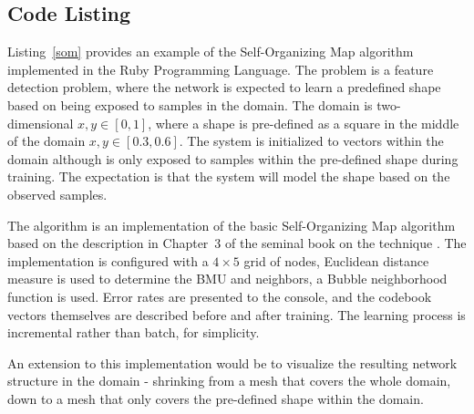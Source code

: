 \subsection{Code Listing}
Listing~\ref{som} provides an example of the Self-Organizing Map algorithm implemented in the Ruby Programming Language. 
The problem is a feature detection problem, where the network is expected to learn a predefined shape based on being exposed to samples in the domain. The domain is two-dimensional $x,y \in [0,1]$, where a shape is pre-defined as a square in the middle of the domain $x,y \in [0.3,0.6]$. The system is initialized to vectors within the domain although is only exposed to samples within the pre-defined shape during training. The expectation is that the system will model the shape based on the observed samples.

The algorithm is an implementation of the basic Self-Organizing Map algorithm based on the description in Chapter~3 of the seminal book on the technique \cite{Kohonen1995}. The implementation is configured with a $4 \times 5$ grid of nodes, Euclidean distance measure is used to determine the BMU and neighbors, a Bubble neighborhood function is used. Error rates are presented to the console, and the codebook vectors themselves are described before and after training. The learning process is incremental rather than batch, for simplicity. 

An extension to this implementation would be to visualize the resulting network structure in the domain - shrinking from a mesh that covers the whole domain, down to a mesh that only covers the pre-defined shape within the domain.



